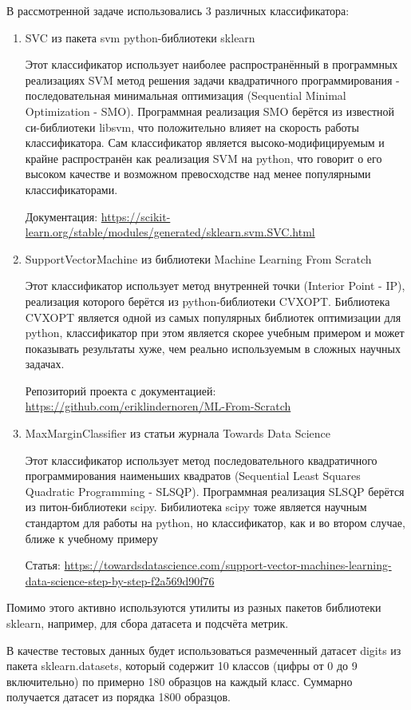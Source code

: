 \documentclass[12pt,a4paper]{article}
\begin{document}
В рассмотренной задаче использовались 3 различных классификатора:
\begin{enumerate}
    \item SVC из пакета svm python-библиотеки sklearn
    
    Этот классификатор использует наиболее распространённый в программных реализациях SVM метод решения задачи квадратичного программирования - последовательная минимальная оптимизация (Sequential Minimal Optimization - SMO). Программная реализация SMO берётся из известной си-библиотеки libsvm, что положительно влияет на скорость работы классификатора. Сам классификатор является высоко-модифицируемым и крайне распространён как реализация SVM на python, что говорит о его высоком качестве и возможном превосходстве над менее популярными классификаторами.
    
    Документация: \url{https://scikit-learn.org/stable/modules/generated/sklearn.svm.SVC.html}
    \item SupportVectorMachine из библиотеки Machine Learning From Scratch
    
    Этот классификатор использует метод внутренней точки (Interior Point - IP), реализация которого берётся из python-библиотеки CVXOPT. Библиотека CVXOPT является одной из самых популярных библиотек оптимизации для python, классификатор при этом является скорее учебным примером и может показывать результаты хуже, чем реально используемым в сложных научных задачах.
    
    Репозиторий проекта с документацией: \url{https://github.com/eriklindernoren/ML-From-Scratch}
    \item MaxMarginClassifier из статьи журнала Towards Data Science
    
    Этот классификатор использует метод последовательного квадратичного программирования наименьших квадратов (Sequential Least Squares Quadratic Programming - SLSQP). Программная реализация SLSQP берётся из питон-библиотеки scipy. Бибилиотека scipy тоже является научным стандартом для работы на python, но классификатор, как и во втором случае, ближе к учебному примеру
    
    Статья: \url{https://towardsdatascience.com/support-vector-machines-learning-data-science-step-by-step-f2a569d90f76}
\end{enumerate}
 Помимо этого активно используются утилиты из разных пакетов библиотеки sklearn, например, для сбора датасета и подсчёта метрик.

В качестве тестовых данных будет использоваться размеченный датасет digits из пакета sklearn.datasets, который содержит 10 классов (цифры от 0 до 9 включительно) по примерно 180 образцов на каждый класс. Суммарно получается датасет из порядка 1800 образцов.
\end{document}

